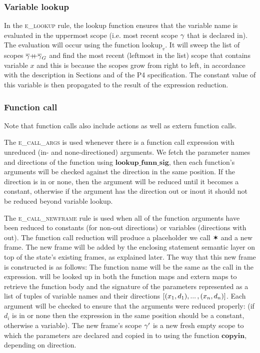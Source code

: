 \documentclass[UTF8]{article}
\begin{document}
\subsubsection*{Variable lookup}
In the \textsc{e\_lookup} rule, the lookup function ensures that the variable name \vn{} is evaluated in the uppermost scope (i.e. most recent scope $\gamma$ that \vn{} is declared in). The evaluation will occur using the function $\mathrm{lookup}_v$. It will sweep the list of scopes $\overline{\gamma} {+}\mspace{-8mu}{+} \overline{\gamma}_G$ and find the most recent (leftmost in the list) scope that contains variable $x$ and this is because the scopes grow from right to left, in accordance with the description in Sections  and  of the P4 specification. The constant value of this variable is then propagated to the result of the expression reduction.

\begin{figure}[ht!]
    \ottusedrule{\ottdruleeXXlookup{}} 
\end{figure}



\subsubsection*{Function call}
Note that function calls also include actions as well as extern function calls.

The \textsc{e\_call\_args} is used whenever there is a function call expression with unreduced (in- and none-directioned) arguments. We fetch the parameter names and directions of the function using $\mathbf{lookup\_funn\_sig}$, then each function's arguments will be checked against the direction in the same position. If the direction is in or none, then the argument will be reduced until it becomes a constant, otherwise if the argument has the direction out or inout it should not be reduced beyond variable lookup.

The \textsc{e\_call\_newframe} rule is used when all of the function arguments have been reduced to constants (for non-out directions) or variables (directions with out). The function call reduction will produce a placeholder we call $\varstar$ and a new frame. The new frame will be added by the enclosing statement semantic layer on top of the state's existing frames, as explained later.
The way that this new frame is constructed is as follows: The function name \funn{} will be the same as the call in the expression. \funn{} will be looked up in both the function maps and extern maps to retrieve the function body \stmt{} and the signature of the parameters represented as a list of tuples of variable names and their directions $ [(x{}_1, d_1) , ... \, , (x{}_n, d_n) ] $. Each argument will be checked to ensure that the arguments were reduced properly: (if $d_i$ is in or none then the expression in the same position should be a constant, otherwise a variable). The new frame's scope $\gamma'$ is a new fresh empty scope to which the parameters are declared and copied in to using the function $\mathbf{copyin}$, depending on direction.
\end{document}
